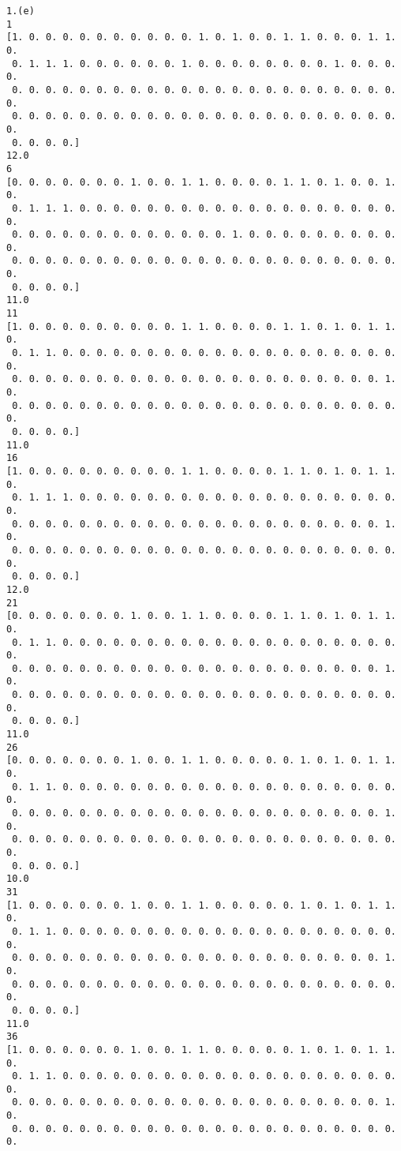 \documentclass[11pt]{article}
\begin{document}
    \begin{Verbatim}[commandchars=\\\{\}]
1.(e)
1
[1. 0. 0. 0. 0. 0. 0. 0. 0. 0. 0. 1. 0. 1. 0. 0. 1. 1. 0. 0. 0. 1. 1. 0.
 0. 1. 1. 1. 0. 0. 0. 0. 0. 0. 1. 0. 0. 0. 0. 0. 0. 0. 0. 1. 0. 0. 0. 0.
 0. 0. 0. 0. 0. 0. 0. 0. 0. 0. 0. 0. 0. 0. 0. 0. 0. 0. 0. 0. 0. 0. 0. 0.
 0. 0. 0. 0. 0. 0. 0. 0. 0. 0. 0. 0. 0. 0. 0. 0. 0. 0. 0. 0. 0. 0. 0. 0.
 0. 0. 0. 0.]
12.0
6
[0. 0. 0. 0. 0. 0. 0. 1. 0. 0. 1. 1. 0. 0. 0. 0. 1. 1. 0. 1. 0. 0. 1. 0.
 0. 1. 1. 1. 0. 0. 0. 0. 0. 0. 0. 0. 0. 0. 0. 0. 0. 0. 0. 0. 0. 0. 0. 0.
 0. 0. 0. 0. 0. 0. 0. 0. 0. 0. 0. 0. 0. 1. 0. 0. 0. 0. 0. 0. 0. 0. 0. 0.
 0. 0. 0. 0. 0. 0. 0. 0. 0. 0. 0. 0. 0. 0. 0. 0. 0. 0. 0. 0. 0. 0. 0. 0.
 0. 0. 0. 0.]
11.0
11
[1. 0. 0. 0. 0. 0. 0. 0. 0. 0. 1. 1. 0. 0. 0. 0. 1. 1. 0. 1. 0. 1. 1. 0.
 0. 1. 1. 0. 0. 0. 0. 0. 0. 0. 0. 0. 0. 0. 0. 0. 0. 0. 0. 0. 0. 0. 0. 0.
 0. 0. 0. 0. 0. 0. 0. 0. 0. 0. 0. 0. 0. 0. 0. 0. 0. 0. 0. 0. 0. 0. 1. 0.
 0. 0. 0. 0. 0. 0. 0. 0. 0. 0. 0. 0. 0. 0. 0. 0. 0. 0. 0. 0. 0. 0. 0. 0.
 0. 0. 0. 0.]
11.0
16
[1. 0. 0. 0. 0. 0. 0. 0. 0. 0. 1. 1. 0. 0. 0. 0. 1. 1. 0. 1. 0. 1. 1. 0.
 0. 1. 1. 1. 0. 0. 0. 0. 0. 0. 0. 0. 0. 0. 0. 0. 0. 0. 0. 0. 0. 0. 0. 0.
 0. 0. 0. 0. 0. 0. 0. 0. 0. 0. 0. 0. 0. 0. 0. 0. 0. 0. 0. 0. 0. 0. 1. 0.
 0. 0. 0. 0. 0. 0. 0. 0. 0. 0. 0. 0. 0. 0. 0. 0. 0. 0. 0. 0. 0. 0. 0. 0.
 0. 0. 0. 0.]
12.0
21
[0. 0. 0. 0. 0. 0. 0. 1. 0. 0. 1. 1. 0. 0. 0. 0. 1. 1. 0. 1. 0. 1. 1. 0.
 0. 1. 1. 0. 0. 0. 0. 0. 0. 0. 0. 0. 0. 0. 0. 0. 0. 0. 0. 0. 0. 0. 0. 0.
 0. 0. 0. 0. 0. 0. 0. 0. 0. 0. 0. 0. 0. 0. 0. 0. 0. 0. 0. 0. 0. 0. 1. 0.
 0. 0. 0. 0. 0. 0. 0. 0. 0. 0. 0. 0. 0. 0. 0. 0. 0. 0. 0. 0. 0. 0. 0. 0.
 0. 0. 0. 0.]
11.0
26
[0. 0. 0. 0. 0. 0. 0. 1. 0. 0. 1. 1. 0. 0. 0. 0. 0. 1. 0. 1. 0. 1. 1. 0.
 0. 1. 1. 0. 0. 0. 0. 0. 0. 0. 0. 0. 0. 0. 0. 0. 0. 0. 0. 0. 0. 0. 0. 0.
 0. 0. 0. 0. 0. 0. 0. 0. 0. 0. 0. 0. 0. 0. 0. 0. 0. 0. 0. 0. 0. 0. 1. 0.
 0. 0. 0. 0. 0. 0. 0. 0. 0. 0. 0. 0. 0. 0. 0. 0. 0. 0. 0. 0. 0. 0. 0. 0.
 0. 0. 0. 0.]
10.0
31
[1. 0. 0. 0. 0. 0. 0. 1. 0. 0. 1. 1. 0. 0. 0. 0. 0. 1. 0. 1. 0. 1. 1. 0.
 0. 1. 1. 0. 0. 0. 0. 0. 0. 0. 0. 0. 0. 0. 0. 0. 0. 0. 0. 0. 0. 0. 0. 0.
 0. 0. 0. 0. 0. 0. 0. 0. 0. 0. 0. 0. 0. 0. 0. 0. 0. 0. 0. 0. 0. 0. 1. 0.
 0. 0. 0. 0. 0. 0. 0. 0. 0. 0. 0. 0. 0. 0. 0. 0. 0. 0. 0. 0. 0. 0. 0. 0.
 0. 0. 0. 0.]
11.0
36
[1. 0. 0. 0. 0. 0. 0. 1. 0. 0. 1. 1. 0. 0. 0. 0. 0. 1. 0. 1. 0. 1. 1. 0.
 0. 1. 1. 0. 0. 0. 0. 0. 0. 0. 0. 0. 0. 0. 0. 0. 0. 0. 0. 0. 0. 0. 0. 0.
 0. 0. 0. 0. 0. 0. 0. 0. 0. 0. 0. 0. 0. 0. 0. 0. 0. 0. 0. 0. 0. 0. 1. 0.
 0. 0. 0. 0. 0. 0. 0. 0. 0. 0. 0. 0. 0. 0. 0. 0. 0. 0. 0. 0. 0. 0. 0. 0.

\end{Verbatim}
\end{document}
